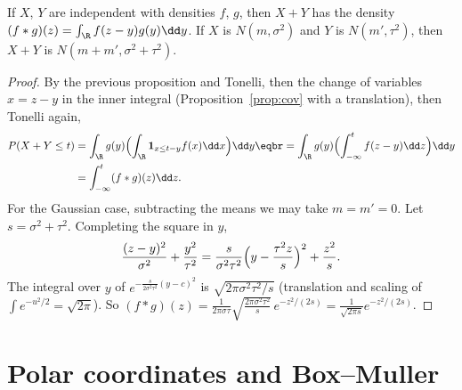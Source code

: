 \begin{proposition}\label{prop:gausssum}
If $X$, $Y$ are independent with densities $f$, $g$, then $X+Y$ has the density $(f*g)(z)=\int_\R f(z-y)g(y)\dd y$. If $X$ is
$N(m,\sigma^2)$ and $Y$ is $N(m',\tau^2)$, then $X+Y$ is $N(m+m',\sigma^2+\tau^2)$.
\end{proposition}
\begin{proof}
By the previous proposition and Tonelli, then the change of variables $x=z-y$ in the inner integral (Proposition~\ref{prop:cov} with a
translation), then Tonelli again,
\[
\begin{aligned}
P(X+Y\le t)&=\int_\R g(y)\Bigl(\int_\R\mathbf 1_{x\le t-y}f(x)\dd x\Bigr)\dd y\eqbr=\int_\R g(y)\Bigl(\int_{-\infty}^tf(z-y)\dd z\Bigr)\dd y\\
&=\int_{-\infty}^t(f*g)(z)\dd z.
\end{aligned}
\]
For the Gaussian case, subtracting the means we may take $m=m'=0$. Let $s=\sigma^2+\tau^2$. Completing the square in $y$,
\[
\frac{(z-y)^2}{\sigma^2}+\frac{y^2}{\tau^2}=\frac s{\sigma^2\tau^2}\Bigl(y-\frac{\tau^2z}s\Bigr)^2+\frac{z^2}s.
\]
The integral over $y$ of $e^{-\frac s{2\sigma^2\tau^2}(y-c)^2}$ is $\sqrt{2\pi\sigma^2\tau^2/s}$ (translation and scaling of $\int e^{-u^2/2}=\sqrt{2\pi}$). So
$(f*g)(z)=\frac1{2\pi\sigma\tau}\sqrt{\frac{2\pi\sigma^2\tau^2}s}\,e^{-z^2/(2s)}=\frac1{\sqrt{2\pi s}}e^{-z^2/(2s)}$.
\end{proof}

\section{Polar coordinates and Box--Muller}\label{sec:polar}

